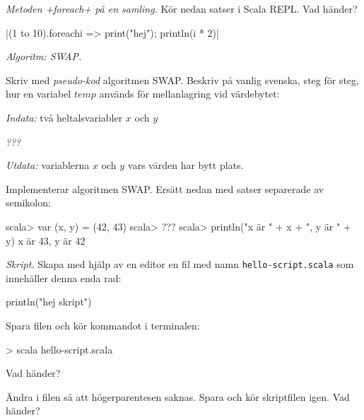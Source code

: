 \Subtask {}

\Subtask {}

\Subtask {}

\Subtask {}

\Subtask {}

\Task \emph{Metoden \code+foreach+ på en samling.} Kör nedan satser i Scala REPL. Vad händer?

\Subtask {}

\Subtask {}

\Subtask \code|(1 to 10).foreach{i => print("hej"); println(i * 2)}|

\Subtask {}

\Subtask {}


\Task \emph{Algoritm: SWAP.}

\Subtask Skriv med \emph{pseudo-kod} algoritmen SWAP. Beskriv på vanlig svenska, steg för steg, hur en variabel $temp$ används för mellanlagring vid värdebytet: 

\emph{Indata:} två heltalsvariabler $x$ och $y$ 

\emph{???}

\emph{Utdata:} variablerna $x$ och $y$ vars värden har bytt plats.

\Subtask Implementerar algoritmen SWAP. Ersätt  nedan med satser separerade av semikolon:

\begin{REPL}
scala> var (x, y) = (42, 43)
scala> ???
scala> println("x är " + x + ", y är " + y)
x är 43, y är 42
\end{REPL}



\Task \emph{Skript.} Skapa med hjälp av en editor en fil med namn \texttt{hello-script.scala} som innehåller denna enda rad:
\begin{Code}
println("hej skript")
\end{Code}
Spara filen och kör kommandot  i terminalen:
\begin{REPL}
> scala hello-script.scala
\end{REPL}

\Subtask Vad händer?

\Subtask Ändra i filen så att högerparentesen saknas. Spara och kör skriptfilen igen. Vad händer?

